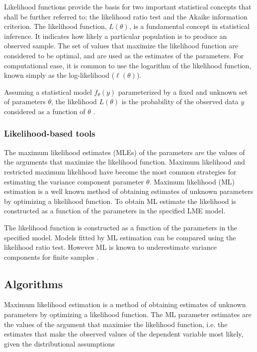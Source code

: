 \documentclass[12pt, a4paper]{report}
\theoremstyle{plain}
\theoremstyle{definition}
\theoremstyle{remark}
\begin{document}
	
	Likelihood functions provide the basis for two important statistical concepts that shall be further referred to; the likelihood ratio test and the Akaike information criterion. The likelihood function, $L(\theta)$, is a fundamental concept in statistical
	inference. It indicates how likely a particular population is to produce an observed sample. The set of values that maximize the
	likelihood function are considered to be optimal, and are used as the estimates of the parameters. For computational ease, it is common to use the logarithm of the likelihood function, known simply as the log-likelihood ($\ell(\theta)$).
	
	Assuming a statistical model $f_{\theta}(y)$ parameterized by a fixed and unknown set of parameters $\theta$, the likelihood $L(\theta)$ is the probability of the observed data $y$ considered as a function of $\theta$ \citep{YLee}.
	
	\subsubsection{Likelihood-based tools}
	The maximum likelihood estimates (MLEs) of the parameters are the values of the arguments that maximize the likelihood function. Maximum likelihood and restricted maximum likelihood have become the most common strategies for estimating the variance component parameter $\theta.$ Maximum likelihood (ML) estimation is a well known method of
	obtaining estimates of unknown parameters by optimizing a likelihood function.  To obtain ML estimate the likelihood is constructed as a function of the parameters in the specified LME model. 
	
	The	likelihood function is constructed as a function of the parameters
	in the specified model. Models fitted by ML estimation can be compared using the likelihood ratio test. However ML is known to underestimate variance components for finite samples \citep{Demi}. 
	

	
	
	
	
	
	\subsection{Algorithms}
	Maximum likelihood estimation is a method of obtaining estimates
	of unknown parameters by optimizing a likelihood function. The ML
	parameter estimates are the values of the argument that maximise
	the likelihood function, i.e. the estimates that make the observed
	values of the dependent variable most likely, given the
	distributional assumptions
	
\end{document}
